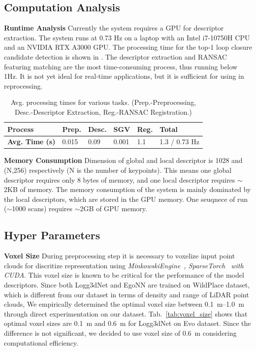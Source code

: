 \subsection*{Computation Analysis}
{\textbf{Runtime Analysis}}\hspace{0.5em} Currently the system requires a GPU for descriptor extraction. The system runs at 0.73 Hz on a laptop with an Intel i7-10750H CPU and an NVIDIA RTX A3000 GPU. The processing time for the top-1 loop closure candidate detection is shown in . The descriptor extraction and RANSAC featuring matching are the most time-consuming process, thus running below 1Hz. It is not yet ideal for real-time applications, but it is sufficient for using in reprocessing. 
\begin{table}[h]
  \centering
  \small
  \begin{tabular}{@{}llllll@{}}
  \toprule
  \textbf{Process} & \textbf{Prep.} & \textbf{Desc.} & \textbf{SGV} & \textbf{Reg.} & \textbf{Total} \\ \midrule
  \textbf{Avg. Time (s)} & 0.015 & 0.09 & 0.001 & 1.1 & 1.3 / 0.73 Hz \\
  \bottomrule
  \end{tabular}
  \caption{Avg. processing times for various tasks. (Prep.-Preprocessing, Desc.-Descriptor Extraction, Reg.-RANSAC Registration.)}
  \label{tab:my-table}
\end{table}
\newline
\textbf{Memory Consumption}\hspace{0.5em} Dimension of global and local descriptor is 1028 and (N,256) respectively (N is the number of keypoints). This means one global descriptor requires only 8 bytes of memory, and one local descriptor requires $\sim$2KB of memory. The memory consumption of the system is mainly dominated by the local descriptors, which are stored in the GPU memory. One seuqnece of run ($\sim$1000 scans) requires $\sim$2GB of GPU memory.

\subsection*{Hyper Parameters}
\textbf{Voxel Size}\hspace{0.5em} During preprocessing step it is necessary to voxelize input point clouds for discritize representation using \emph{MinkowskiEngine~\cite{choy20194cvpr}, SparseTorch~\cite{tang2023MICRO} with CUDA}. This voxel size is known to be critical for the performance of the model descriptors. Since both Logg3dNet and EgoNN are trained on WildPlace dataset, which is different from our dataset in terms of density and range of LiDAR point clouds, We empirically determined the optimal voxel size between \SIrange{0.1}{1.0}{\meter} through direct experimentation on our dataset. Tab.~\ref{tab:voxel_size} shows that optimal voxel sizes are \SI{0.1}{\meter} and \SI{0.6}{\meter} for Logg3dNet on Evo dataset. Since the difference is not significant, we decided to use voxel size of \SI{0.6}{\meter} considering computational efficiency.\\

